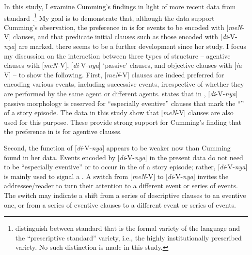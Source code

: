 \documentclass[output=paper
,modfonts
,nonflat]{langsci/langscibook}
\begin{document}
In this study, I examine Cumming’s findings in light of more recent data from standard .\footnote{\citet{ColeEtAl2008} distinguish between standard  that is the formal variety of the language and the “prescriptive standard” variety, i.e., the highly institutionally prescribed variety. No such distinction is made in this study.}  My goal is to demonstrate that, although the data support Cumming’s observation, the preference in  is for events to be encoded with [\textit{meN}-V] clauses, and that predicate initial clauses such as those encoded with [\textit{di}-V-\textit{nya}] are marked, there seems to be a further development since her study. I focus my discussion on the interaction between three types of  structure – agentive clauses with [\textit{meN-}V], [\textit{di}-V-\textit{nya}] ‘passive’ clauses, and objective clauses with [\textit{ia} V] – to show the following. First, [\textit{meN}-V] clauses are indeed preferred for encoding various events, including successive events, irrespective of whether they are performed by the same agent or different agents. \citet[175]{Cumming1991} states that in , [\textit{di}-V-\textit{nya}] passive morphology is reserved for “especially eventive” clauses that mark the “” of a story episode. The data in this study show that [\textit{meN}-V] clauses are also used for this purpose. These provide strong support for Cumming’s finding that the preference in  is for agentive clauses.

Second, the function of [\textit{di}-V-\textit{nya}] appears to be weaker now than Cumming found in her data. Events encoded by [\textit{di}-V-\textit{nya}] in the present data do not need to be “especially eventive” or to occur in the  of a story episode; rather, [\textit{di}-V-\textit{nya}] is mainly used to signal a . A switch from [\textit{meN}-V] to [\textit{di}-V-\textit{nya}] invites the addressee/reader to turn their attention to a different event or series of events. The switch may indicate a shift from a series of descriptive clauses to an eventive one, or from a series of eventive clauses to a different event or series of events. 
\end{document}

